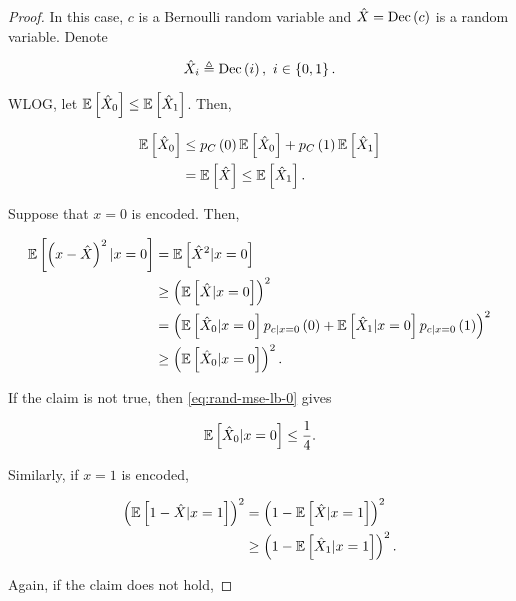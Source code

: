 \documentclass[twoside]{article}
\begin{document}
\begin{proof}
    In this case, \(c\) is a Bernoulli random variable and \(\hat{X}=\mathrm{Dec}\left(c\right)\) is a random variable. Denote

    \begin{equation}
        \hat{X}_i \triangleq \mathrm{Dec}\left(i\right),\ i \in \left\{0,1\right\}.
        \label{eq:X-hat-i-def}
    \end{equation}

    WLOG, let \(\mathbb{E}\left[ \hat{X}_0 \right] \le \mathbb{E}\left[ \hat{X}_1 \right]\). Then,

    \begin{align}
        \mathbb{E}\left[ \hat{X}_0 \right] &\le p_C\left(0\right)\mathbb{E}\left[ \hat{X}_0 \right] + p_C\left(1\right)\mathbb{E}\left[ \hat{X}_1 \right] \\
                         &= \mathbb{E}\left[ \hat{X} \right] \le \mathbb{E}\left[ \hat{X}_1 \right].
                         \label{eq:bw-x-hats}
    \end{align}

    Suppose that \(x=0\) is encoded. Then,
    
    \begin{align}
        \mathbb{E}\left[ \left(x-\hat{X}\right)^2|x=0 \right] &= \mathbb{E}\left[ \hat{X}^2|x=0 \right] \\
                                      &\ge \left(\mathbb{E}\left[ \hat{X}|x=0 \right]\right)^2 \\
                                      &= \left(\mathbb{E}\left[ \hat{X}_0|x=0 \right]p_{c|x=0}\left(0\right) + \mathbb{E}\left[ \hat{X}_1|x=0 \right]p_{c|x=0}\left(1\right)\right)^2 \\
                                      &\ge \left(\mathbb{E}\left[ \hat{X}_0|x=0 \right]\right)^2.
                                      \label{eq:rand-mse-lb-0}
    \end{align}

    If the claim is not true, then \eqref{eq:rand-mse-lb-0} gives

    \begin{equation}
        \mathbb{E}\left[ \hat{X}_0|x=0 \right] \le \frac{1}{4}.
        \label{eq:xhat-0}
    \end{equation}

    Similarly, if \(x=1\) is encoded,

    \begin{align}
        \left(\mathbb{E}\left[ 1-\hat{X}|x=1 \right]\right)^2 &= \left(1-\mathbb{E}\left[ \hat{X}|x=1 \right]\right)^2 \\
                                      &\ge \left(1-\mathbb{E}\left[ \hat{X}_1|x=1 \right]\right)^2.
                                      \label{eq:rand-mse-lb-1}
    \end{align}

    Again, if the claim does not hold,


\end{proof}
\end{document}
